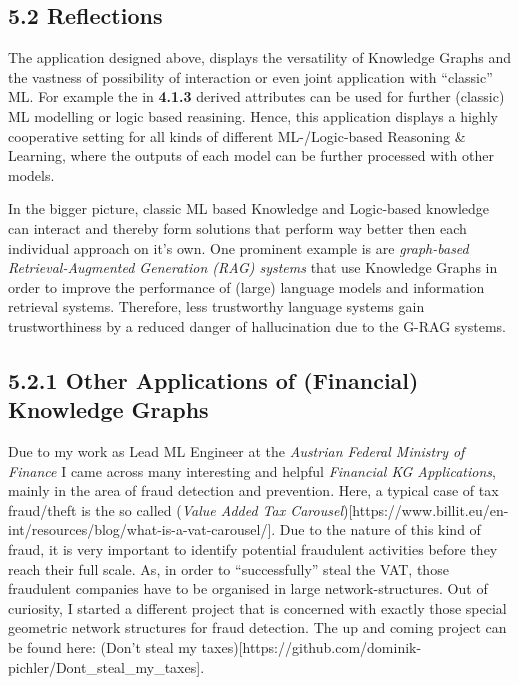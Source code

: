 \subsection{5.2 Reflections}\label{reflections}

The application designed above, displays the versatility of Knowledge
Graphs and the vastness of possibility of interaction or even joint
application with ``classic'' ML. For example the in \textbf{4.1.3}
derived attributes can be used for further (classic) ML modelling or
logic based reasining. Hence, this application displays a highly
cooperative setting for all kinds of different ML-/Logic-based Reasoning
\& Learning, where the outputs of each model can be further processed
with other models.

In the bigger picture, classic ML based Knowledge and Logic-based
knowledge can interact and thereby form solutions that perform way
better then each individual approach on it's own. One prominent example
is are \emph{graph-based Retrieval-Augmented Generation (RAG) systems}
that use Knowledge Graphs in order to improve the performance of (large)
language models and information retrieval systems. Therefore, less
trustworthy language systems gain trustworthiness by a reduced danger of
hallucination due to the G-RAG systems.

\subsection{5.2.1 Other Applications of (Financial) Knowledge
Graphs}\label{other-applications-of-financial-knowledge-graphs}

Due to my work as Lead ML Engineer at the \emph{Austrian Federal
Ministry of Finance} I came across many interesting and helpful
\emph{Financial KG Applications}, mainly in the area of fraud detection
and prevention. Here, a typical case of tax fraud/theft is the so called
(\emph{Value Added Tax
Carousel}){[}https://www.billit.eu/en-int/resources/blog/what-is-a-vat-carousel/{]}.
Due to the nature of this kind of fraud, it is very important to
identify potential fraudulent activities before they reach their full
scale. As, in order to ``successfully'' steal the VAT, those fraudulent
companies have to be organised in large network-structures. Out of
curiosity, I started a different project that is concerned with exactly
those special geometric network structures for fraud detection. The up
and coming project can be found here: (Don't steal my
taxes){[}https://github.com/dominik-pichler/Dont\_steal\_my\_taxes{]}.

